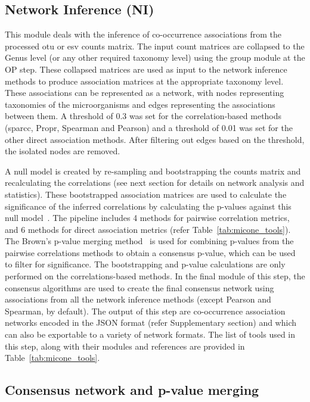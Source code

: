   \subsection*{Network Inference (NI)}
  \vspace{-5mm}
  This module deals with the inference of co-occurrence associations from the processed \ac{otu} or \ac{esv} counts matrix.
  The input count matrices are collapsed to the Genus level (or any other required taxonomy level) using the group module at the OP step.
  These collapsed matrices are used as input to the network inference methods to produce association matrices at the appropriate taxonomy level.
  These associations can be represented as a network, with nodes representing taxonomies of the microorganisms and edges representing the associations between them.
  A threshold of 0.3 was set for the correlation-based methods (\ac{sparcc}, Propr, Spearman and Pearson) and a threshold of 0.01 was set for the other direct association methods.
  After filtering out edges based on the threshold, the isolated nodes are removed.

  A null model is created by re-sampling and bootstrapping the counts matrix and recalculating the correlations (see next section for details on network analysis and statistics).
  These bootstrapped association matrices are used to calculate the significance of the inferred correlations by calculating the p-values against this null model~\cite{Watts2018}.
  The pipeline includes 4 methods for pairwise correlation metrics, and 6 methods for direct association metrics (refer Table~\ref{tab:micone_tools}).
  The Brown's p-value merging method~\cite{brown_400_1975} is used for combining p-values from the pairwise correlations methods to obtain a consensus p-value, which can be used to filter for significance.
  The bootstrapping and p-value calculations are only performed on the correlations-based methods.
  In the final module of this step, the consensus algorithms are used to create the final consensus network using associations from all the network inference methods (except Pearson and Spearman, by default).
  The output of this step are co-occurrence association networks encoded in the JSON format (refer Supplementary section) and which can also be exportable to a variety of network formats.
  The list of tools used in this step, along with their modules and references are provided in Table~\ref{tab:micone_tools}.

  \subsection*{Consensus network and p-value merging}

